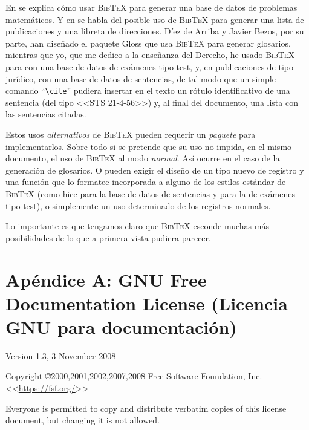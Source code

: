 \documentclass[a4paper,11pt]{article}
\def\btx-{\textsc{Bib\TeX}}
\def\cmd#1-{``\texttt{\textbackslash#1}''}
\begin{document}
En \cite{cascales00} se explica cómo usar \btx- para generar una base de datos
de problemas  matemáticos. Y  en \cite{markey05} se  habla del posible  uso de
\btx- para  generar una lista de  publicaciones y una  libreta de direcciones.
Díez de Arriba y Javier Bezos, por su parte, han diseñado el paquete Gloss que
usa  \btx-  para generar  glosarios,  mientras  que yo,  que  me  dedico a  la
enseñanza del Derecho,  he usado \btx- para con una base  de datos de exámenes
tipo test,  y, en  publicaciones de tipo  jurídico, con  una base de  datos de
sentencias, de tal  modo que un simple comando \cmd  cite- pudiera insertar en
el texto un rótulo identificativo  de una sentencia (del tipo <<STS 21-4-56>>)
y, al final del documento, una lista con las sentencias citadas.

Estos usos \emph{alternativos} de \btx- pueden requerir un \emph{paquete} para
implementarlos. Sobre  todo si se pretende que  su uso no impida,  en el mismo
documento, el uso de \btx- al modo  \emph{normal}. Así ocurre en el caso de la
generación  de glosarios.   O pueden  exigir  el diseño  de un  tipo nuevo  de
registro y  una función que  lo formatee incorporada  a alguno de  los estilos
estándar de \btx- (como hice para la  base de datos de sentencias y para la de
exámenes  tipo  test), o  simplemente  un  uso  determinado de  los  registros
normales.

Lo importante es que tengamos claro que \btx- esconde muchas más posibilidades
de lo que a primera vista pudiera parecer.




\appendix


\section*{Apéndice  A:  GNU  Free  Documentation License  (Licencia  GNU  para
  documentación)}
\label{sec:gnu-free-docum}
 \small

\begin{center}
   
  Version 1.3, 3 November 2008
   
  Copyright \copyright 2000,2001,2002,2007,2008 Free Software Foundation, Inc. <<\url{https://fsf.org/}>>
   
  Everyone is permitted to copy and distribute verbatim copies of this license
  document, but changing it is not allowed.
\end{center}
\end{document}
